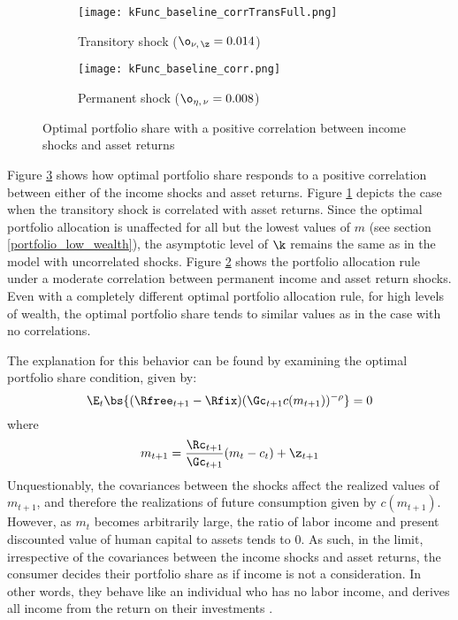 \begin{figure}[h]
    \centering
    \begin{subfigure}{0.49\textwidth}
        \centering
        \texttt{[image: kFunc\_baseline\_corrTransFull.png]}
        \caption{Transitory shock ($\o_{\nu,\,\z} = 0.014$)}
        \label{subfig:correlated_baseline_transitory}
    \end{subfigure}
    \begin{subfigure}{0.49\textwidth}
        \centering
        \texttt{[image: kFunc\_baseline\_corr.png]}
        \caption{Permanent shock ($\o_{\eta,\,\nu} = 0.008$)}
        \label{subfig:correlated_baseline_permanent}
    \end{subfigure}
    \caption{Optimal portfolio share with a positive correlation between income shocks and asset returns}
    \label{fig:correlated_shock_baseline}
\end{figure}

Figure \ref{fig:correlated_shock_baseline} shows how optimal portfolio share responds to a positive correlation between either of the income shocks and asset returns. Figure \ref{subfig:correlated_baseline_transitory} depicts the case when the transitory shock is correlated with asset returns. Since the optimal portfolio allocation is unaffected for all but the lowest values of $m$ (see section \ref{portfolio_low_wealth}), the asymptotic level of $\k$ remains the same as in the model with uncorrelated shocks. Figure \ref{subfig:correlated_baseline_permanent} shows the portfolio allocation rule under a moderate correlation between permanent income and asset return shocks. Even with a completely different optimal portfolio allocation rule, for high levels of wealth, the optimal portfolio share tends to similar values as in the case with no correlations.

The explanation for this behavior can be found by examining the optimal portfolio share condition, given by:
\[
\E_{t}\bs{(\Rfree_{t+1} - \Rfix)(\Gc_{t+1}c(m_{t+1}))^{-\rho}} = 0
\]
where
\[
m_{t+1} = \frac{\Rc_{t+1}}{\Gc_{t+1}}(m_{t} - c_{t}) + \z_{t+1}
\]
Unquestionably, the covariances between the shocks affect the realized values of $m_{t+1}$, and therefore the realizations of future consumption given by $c(m_{t+1})$. However, as $m_{t}$ becomes arbitrarily large, the ratio of labor income and present discounted value of human capital to assets tends to 0. As such, in the limit, irrespective of the covariances between the income shocks and asset returns, the consumer decides their portfolio share as if income is not a consideration. In other words, they behave like an individual who has no labor income, and derives all income from the return on their investments \citep{Carroll2024}.


